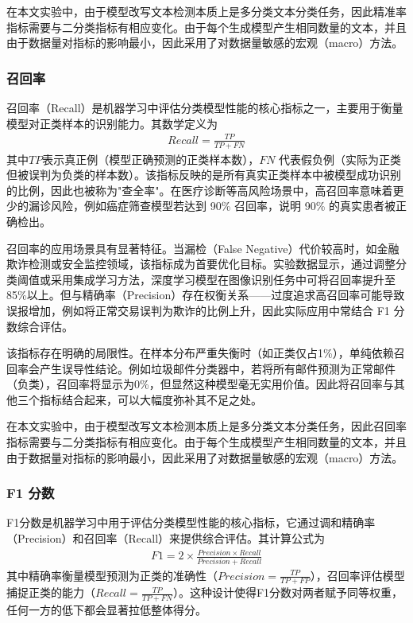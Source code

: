 在本文实验中，由于模型改写文本检测本质上是多分类文本分类任务，因此精准率指标需要与二分类指标有相应变化。由于每个生成模型产生相同数量的文本，并且由于数据量对指标的影响最小，因此采用了对数据量敏感的宏观（macro）方法。

\subsubsection{召回率}

召回率（Recall）是机器学习中评估分类模型性能的核心指标之一，主要用于衡量模型对正类样本的识别能力。其数学定义为
\begin{align}
    Recall = \frac{TP}{TP+FN}
\end{align}
其中$TP$表示真正例（模型正确预测的正类样本数），$FN$ 代表假负例（实际为正类但被误判为负类的样本数）。该指标反映的是所有真实正类样本中被模型成功识别的比例，因此也被称为"查全率"。在医疗诊断等高风险场景中，高召回率意味着更少的漏诊风险，例如癌症筛查模型若达到 90\% 召回率，说明 90\% 的真实患者被正确检出。

召回率的应用场景具有显著特征。当漏检（False Negative）代价较高时，如金融欺诈检测或安全监控领域，该指标成为首要优化目标。实验数据显示，通过调整分类阈值或采用集成学习方法，深度学习模型在图像识别任务中可将召回率提升至85\%以上。但与精确率（Precision）存在权衡关系——过度追求高召回率可能导致误报增加，例如将正常交易误判为欺诈的比例上升，因此实际应用中常结合 F1 分数综合评估。

该指标存在明确的局限性。在样本分布严重失衡时（如正类仅占1\%），单纯依赖召回率会产生误导性结论。例如垃圾邮件分类器中，若将所有邮件预测为正常邮件（负类），召回率将显示为0\%，但显然这种模型毫无实用价值。因此将召回率与其他三个指标结合起来，可以大幅度弥补其不足之处。

在本文实验中，由于模型改写文本检测本质上是多分类文本分类任务，因此召回率指标需要与二分类指标有相应变化。由于每个生成模型产生相同数量的文本，并且由于数据量对指标的影响最小，因此采用了对数据量敏感的宏观（macro）方法。

\subsubsection{F1 分数}

F1分数是机器学习中用于评估分类模型性能的核心指标，它通过调和精确率（Precision）和召回率（Recall）来提供综合评估。其计算公式为
\begin{align}
    F1 = 2 \times \frac{Precision \times Recall}{Precision + Recall}
\end{align}
其中精确率衡量模型预测为正类的准确性（$Precision = \frac{TP}{TP+FP}$），召回率评估模型捕捉正类的能力（$Recall = \frac{TP}{TP+FN}$）。这种设计使得F1分数对两者赋予同等权重，任何一方的低下都会显著拉低整体得分。

